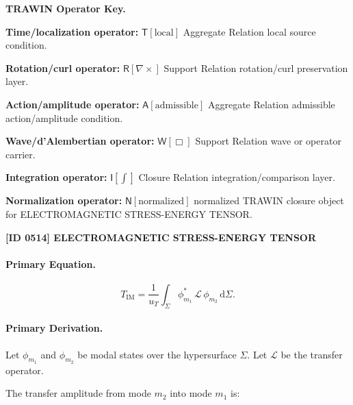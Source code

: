 \par\vspace{0.45\baselineskip}
\noindent\begin{minipage}[t]{\linewidth}
\begingroup
\small
\raggedright
\textbf{TRAWIN Operator Key.}\par
\noindent\textbf{Time/localization operator:} $\mathsf{T}\!\left[\mathrm{local}\right]$ Aggregate Relation local source condition.\par
\noindent\textbf{Rotation/curl operator:} $\mathsf{R}\!\left[\nabla\times\right]$ Support Relation rotation/curl preservation layer.\par
\noindent\textbf{Action/amplitude operator:} $\mathsf{A}\!\left[\mathrm{admissible}\right]$ Aggregate Relation admissible action/amplitude condition.\par
\noindent\textbf{Wave/d'Alembertian operator:} $\mathsf{W}\!\left[\Box\right]$ Support Relation wave or operator carrier.\par
\noindent\textbf{Integration operator:} $\mathsf{I}\!\left[\int\right]$ Closure Relation integration/comparison layer.\par
\noindent\textbf{Normalization operator:} $\mathsf{N}\!\left[\mathrm{normalized}\right]$ normalized TRAWIN closure object for ELECTROMAGNETIC STRESS-ENERGY TENSOR.\par
\endgroup
\end{minipage}

\clearpage
\noindent\textbf{[ID 0514] ELECTROMAGNETIC STRESS-ENERGY TENSOR}\par
\vspace{0.35em}
\paragraph{Primary Equation.}
\begin{equation}
T_{\mathrm{IM}}
=
\frac{1}{u_T}
\int_{\Sigma}
\phi_{m_1}^{*}
\,\mathcal{L}\,
\phi_{m_2}
\,\mathrm{d}\Sigma .
\end{equation}

\paragraph{Primary Derivation.}
Let $\phi_{m_1}$ and $\phi_{m_2}$ be modal states over the hypersurface $\Sigma$.  
Let $\mathcal{L}$ be the transfer operator.

The transfer amplitude from mode $m_2$ into mode $m_1$ is:

